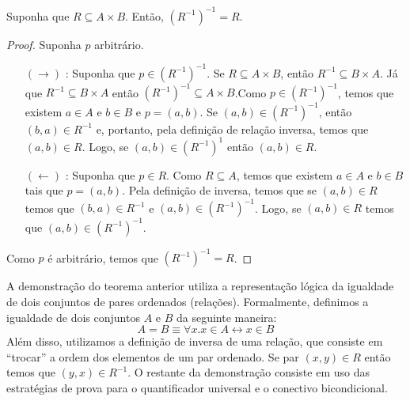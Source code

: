 \begin{Theorem}
Suponha que $R \subseteq A \times B$. Então, $(R^{-1})^{-1} = R$.
\end{Theorem}
\begin{proof}
Suponha $p$ arbitrário.
\begin{itemize}
  \item[$(\to)$]: Suponha que $p\in (R^{-1})^{-1}$. Se $R\subseteq A
    \times B$, então $R^{-1}\subseteq B\times A$. Já que
    $R^{-1}\subseteq B\times A$ então $(R^{-1})^{-1}\subseteq A\times
    B$.Como $p\in (R^{-1})^{-1}$, temos que existem $a\in A$ e $b\in
    B$ e $p = (a,b)$. Se $(a,b) \in (R^{-1})^{-1}$, então $(b,a)\in
    R^{-1}$ e, portanto, pela definição de relação inversa, temos que
    $(a,b)\in R$. Logo, se $(a,b)\in
    (R^{-1})^{1}$ então $(a,b)\in R$.
  \item[$(\leftarrow)$]: Suponha que $p \in R$. Como $R\subseteq A$,
    temos que existem $a\in A$ e $b\in B$ tais que $p = (a,b)$. Pela
    definição de inversa, temos que se $(a,b)\in R$ temos que $(b,a)
    \in R^{-1}$ e $(a,b) \in (R^{-1})^{-1}$. Logo, se $(a,b) \in R$
    temos que $(a,b) \in (R^{-1})^{-1}$.
\end{itemize}
   Como $p$ é arbitrário, temos que $(R^{-1})^{-1} = R$.
\end{proof}

\begin{Commentary}
A demonstração do teorema anterior utiliza a representação lógica da
igualdade de dois conjuntos de pares ordenados
(relações). Formalmente, definimos a igualdade de dois conjuntos $A$ e
$B$ da seguinte maneira:
\[ A = B \equiv \forall x. x \in A \leftrightarrow x \in B \]
Além disso, utilizamos a definição de inversa de uma relação, que
consiste em ``trocar'' a ordem dos elementos de um par ordenado. Se
par $(x,y)\in R$ então temos que $(y,x)\in R^{-1}$. O restante da
demonstração consiste em uso das estratégias de prova para o
quantificador universal e o conectivo bicondicional.
\end{Commentary}

